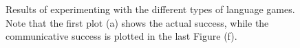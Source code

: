 \begin{figure}[t]
\caption{Results of experimenting with the different types of language games. Note that the first plot (a) shows the actual success, while the communicative success is plotted in the last Figure (f).}
\label{f:par:feedback}
\end{figure}


